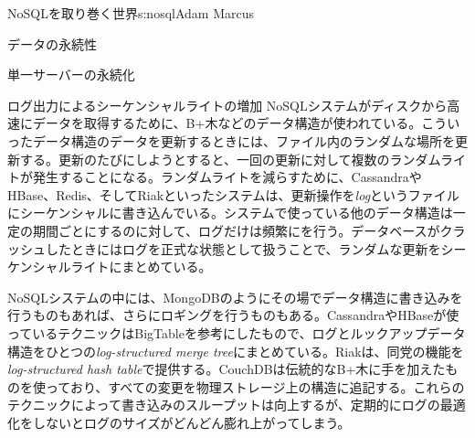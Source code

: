 \begin{aosachapter}{NoSQLを取り巻く世界}{s:nosql}{Adam Marcus}
\begin{aosasect1}{データの永続性}
\begin{aosasect2}{単一サーバーの永続化}
\begin{aosasect3}{ログ出力によるシーケンシャルライトの増加}
NoSQLシステムがディスクから高速にデータを取得するために、B+木などのデータ構造が使われている。こういったデータ構造のデータを更新するときには、ファイル内のランダムな場所を更新する。更新のたびにしようとすると、一回の更新に対して複数のランダムライトが発生することになる。ランダムライトを減らすために、CassandraやHBase、Redis、そしてRiakといったシステムは、更新操作を\emph{log}というファイルにシーケンシャルに書き込んでいる。システムで使っている他のデータ構造は一定の期間ごとにするのに対して、ログだけは頻繁にを行う。データベースがクラッシュしたときにはログを正式な状態として扱うことで、ランダムな更新をシーケンシャルライトにまとめている。

NoSQLシステムの中には、MongoDBのようにその場でデータ構造に書き込みを行うものもあれば、さらにロギングを行うものもある。CassandraやHBaseが使っているテクニックはBigTableを参考にしたもので、ログとルックアップデータ構造をひとつの\emph{log-structured merge tree}にまとめている。Riakは、同党の機能を\emph{log-structured hash table}で提供する。CouchDBは伝統的なB+木に手を加えたものを使っており、すべての変更を物理ストレージ上の構造に追記する。これらのテクニックによって書き込みのスループットは向上するが、定期的にログの最適化をしないとログのサイズがどんどん膨れ上がってしまう。


\end{aosasect3}
\end{aosasect2}
\end{aosasect1}
\end{aosachapter}
